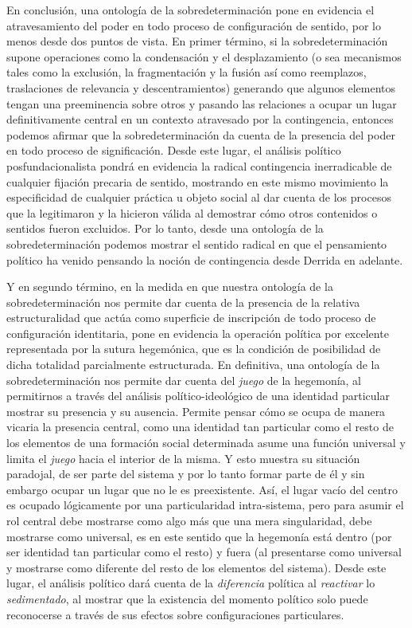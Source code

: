\documentclass{book}
\begin{document}
En conclusión, una ontología de la sobredeterminación pone en evidencia
el atravesamiento del poder en todo proceso de configuración de sentido,
por lo menos desde dos puntos de vista. En primer término, si la
sobredeterminación supone operaciones como la condensación y el
desplazamiento (o sea mecanismos tales como la exclusión, la
fragmentación y la fusión así como reemplazos, traslaciones de
relevancia y descentramientos) generando que algunos elementos tengan
una preeminencia sobre otros y pasando las relaciones a ocupar un lugar
definitivamente central en un contexto atravesado por la contingencia,
entonces podemos afirmar que la sobredeterminación da cuenta de la
presencia del poder en todo proceso de significación. Desde este lugar,
el análisis político posfundacionalista pondrá en evidencia la radical
contingencia inerradicable de cualquier fijación precaria de sentido,
mostrando en este mismo movimiento la especificidad de cualquier
práctica u objeto social al dar cuenta de los procesos que la
legitimaron y la hicieron válida al demostrar cómo otros contenidos o
sentidos fueron excluidos. Por lo tanto, desde una ontología de la
sobredeterminación podemos mostrar el sentido radical en que el
pensamiento político ha venido pensando la noción de contingencia desde
Derrida en adelante.

Y en segundo término, en la medida en que nuestra ontología de la
sobredeterminación nos permite dar cuenta de la presencia de la relativa
estructuralidad que actúa como superficie de inscripción de todo proceso
de configuración identitaria, pone en evidencia la operación política
por excelente representada por la sutura hegemónica, que es la condición
de posibilidad de dicha totalidad parcialmente estructurada. En
definitiva, una ontología de la sobredeterminación nos permite dar
cuenta del \emph{juego} de la hegemonía, al permitirnos a través del
análisis político-ideológico de una identidad particular mostrar su
presencia y su ausencia. Permite pensar cómo se ocupa de manera vicaria
la presencia central, como una identidad tan particular como el resto de
los elementos de una formación social determinada asume una función
universal y limita el \emph{juego} hacia el interior de la misma. Y esto
muestra su situación paradojal, de ser parte del sistema y por lo tanto
formar parte de él y sin embargo ocupar un lugar que no le es
preexistente. Así, el lugar vacío del centro es ocupado lógicamente por
una particularidad intra-sistema, pero para asumir el rol central debe
mostrarse como algo más que una mera singularidad, debe mostrarse como
universal, es en este sentido que la hegemonía está dentro (por ser
identidad tan particular como el resto) y fuera (al presentarse como
universal y mostrarse como diferente del resto de los elementos del
sistema). Desde este lugar, el análisis político dará cuenta de la
\emph{diferencia} política al \emph{reactivar} lo \emph{sedimentado}, al
mostrar que la existencia del momento político solo puede reconocerse a
través de sus efectos sobre configuraciones particulares.
\end{document}
